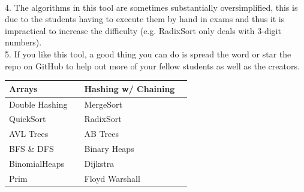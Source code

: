 \documentclass[12pt]{article}
\begin{document}
    \\[0.2in]
    4. The algorithms in this tool are sometimes substantially oversimplified, this is due to the students having to execute them by hand in exams
    and thus it is impractical to increase the difficulty (e.g. RadixSort only deals with 3-digit numbers).
    \\[0.2in]
    5. If you like this tool, a good thing you can do is spread the word or star the repo on GitHub to help out more of your fellow students as well as the creators.
    \vspace{20px}
    \begin{center}
        \begin{tabular}{|P{4cm}|P{1cm}||P{4cm}|P{1cm}|}
            \hline
            Arrays & %
            & Hashing w/ Chaining & %
            \\ \hline
            Double Hashing & %
            & MergeSort & %
            \\ \hline
            QuickSort & %
            & RadixSort & %
            \\ \hline
            AVL Trees & %
            & AB Trees & %
            \\ \hline
            BFS \& DFS & %
            & Binary Heaps & %
            \\ \hline
            BinomialHeaps & %
            & Dijkstra & %
            \\ \hline
            Prim & %
            & Floyd Warshall & %
            \\ \hline
        \end{tabular}
    \end{center}
\end{document}
